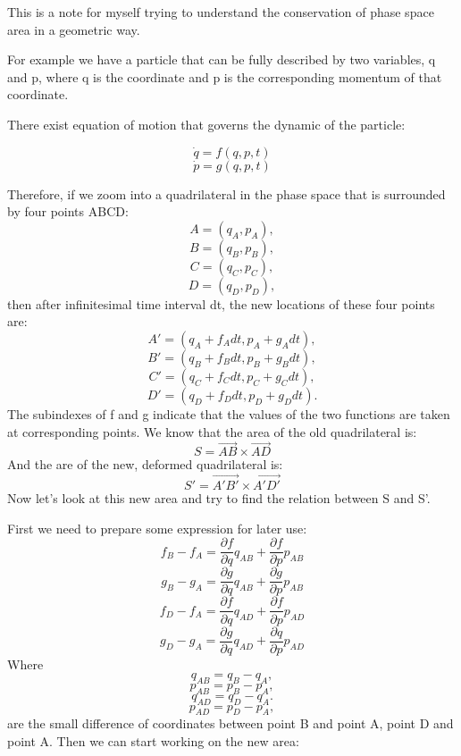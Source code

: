 \documentclass{article}
\begin{document}
	This is a note for myself trying to understand the conservation of phase space area in a geometric way. 
	
	For example we have a particle that can be fully described by two variables, q and p, where q is the coordinate and p is the corresponding momentum of that coordinate. 
	
	There exist equation of motion that governs the dynamic of the particle:
	
	$$ \dot{q} = f(q,p,t)$$
	$$ \dot{p} = g(q,p,t)$$
	
	Therefore, if we zoom into a quadrilateral in the phase space that is surrounded by four points ABCD: 
	$$ A = (q_A, p_A),$$
	$$ B = (q_B, p_B),$$
	$$ C = (q_C, p_C),$$
	$$ D = (q_D, p_D),$$
	then after infinitesimal time interval dt, the new locations of these four points are:
	$$ A' = (q_A+f_Adt, p_A+g_Adt),$$
	$$ B' = (q_B+f_Bdt, p_B+g_Bdt),$$
	$$ C' = (q_C+f_Cdt, p_C+g_Cdt),$$
	$$ D' = (q_D+f_Ddt, p_D+g_Ddt).$$
	The subindexes of f and g indicate that the values of the two functions are taken at corresponding points. 
	We know that the area of the old quadrilateral is:
	$$ S = \vec{AB}\times\vec{AD}$$
	And the are of the new, deformed quadrilateral is:
	$$ S' = \vec{A'B'}\times\vec{A'D'}$$
	Now let's look at this new area and try to find the relation between S and S'.\par
	First we need to prepare some expression for later use:
	$$ f_B-f_A = \frac{\partial{f}}{\partial{q}}q_{AB}+\frac{\partial{f}}{\partial{p}}p_{AB}$$
	$$ g_B-g_A = \frac{\partial{g}}{\partial{q}}q_{AB}+\frac{\partial{g}}{\partial{p}}p_{AB}$$
	$$ f_D-f_A = \frac{\partial{f}}{\partial{q}}q_{AD}+\frac{\partial{f}}{\partial{p}}p_{AD}$$
	$$ g_D-g_A = \frac{\partial{g}}{\partial{q}}q_{AD}+\frac{\partial{q}}{\partial{p}}p_{AD}$$
	Where 
	$$q_{AB} = q_B-q_A,$$
	$$p_{AB} = p_B-p_A,$$
	$$q_{AD} = q_D-q_A.$$
	$$p_{AD} = p_D-p_A,$$
	are the small difference of coordinates between point B and point A, point D and point A.
	Then we can start working on the new area:
\end{document}
